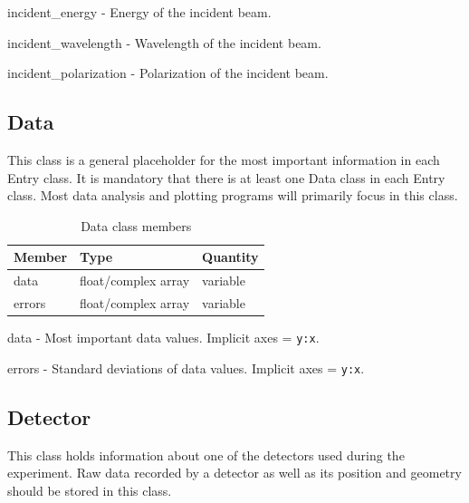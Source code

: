 \documentclass[usletter,11pt]{article}
\newcommand{\member}[2]
{ \noindent
{ \color{softBlue}  #1 - } #2
\vspace{0.2cm}
}
\begin{document}
\member{incident\_energy}{Energy of the incident beam.}

\member{incident\_wavelength}{Wavelength of the incident beam.}

\member{incident\_polarization}{Polarization of the incident beam.}

\subsection{Data}
\label{table:data}

This class is a general placeholder for the most important information
in each Entry class. It is mandatory that there is at least one Data
class in each Entry class. Most data analysis and plotting programs
will primarily focus in this class.

\begin{table}[h!]\sffamily \footnotesize
\caption{Data class members}

\begin{tabular}{p{4.5cm} p{4.5cm}  p{2.5cm} }
\toprule
\bfseries Member     & \bfseries Type & \bfseries Quantity \\
\midrule
data  & float/complex array & variable  \\
errors  & float/complex array & variable \\
\bottomrule
\end{tabular}
\end{table}

\member{data}{Most important data values. Implicit axes = {\tt y:x}.}

\member{errors}{Standard deviations of data values. Implicit axes = {\tt y:x}.}

\subsection{Detector}
\label{table:detector}

This class holds information about one of the detectors used during
the experiment. Raw data recorded by a detector as well as its position
and geometry should be stored in this class.
\end{document}
